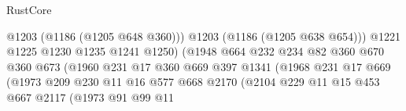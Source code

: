 \begin{lexlean}{RustCore}
\begin{coremodule}
                                                @1203
                                                (@1186 (@1205 @648 @360)))
                                              @1203
                                              (@1186 (@1205 @638 @654)))
                                            @1221
                                            @1225
                                            @1230
                                            @1235
                                            @1241
                                            @1250)
                                          (@1948
                                            @664
                                            @232
                                            @234
                                            @82
                                            @360
                                            @670
                                            @360
                                            @673
                                            (@1960
                                              @231
                                              @17
                                              @360
                                              @669
                                              @397
                                              @1341
                                              (@1968
                                                @231
                                                @17
                                                @669
                                                (@1973
                                                  @209
                                                  @230
                                                  @11
                                                  @16
                                                  @577
                                                  @668
                                                  @2170
                                                  (@2104
                                                    @229
                                                    @11
                                                    @15
                                                    @453
                                                    @667
                                                    @2117
                                                    (@1973
                                                      @91
                                                      @99
                                                      @11

\end{coremodule}
\end{lexlean}
